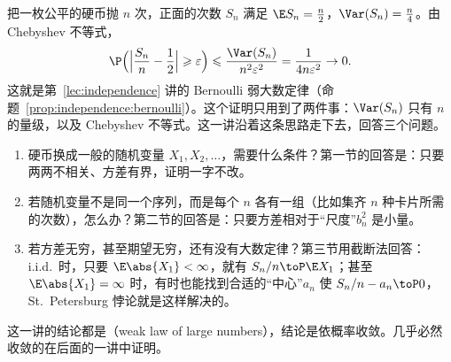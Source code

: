 \label{lec:weak-laws}

把一枚公平的硬币抛 $n$ 次，正面的次数 $S_n$ 满足 $\E S_n=\frac n2$，$\Var(S_n)=\frac n4$。由 Chebyshev 不等式，
\[
\P\Bigl(\Bigl\lvert\frac{S_n}n-\frac12\Bigr\rvert\geqslant\varepsilon\Bigr)\leqslant\frac{\Var(S_n)}{n^2\varepsilon^2}=\frac1{4n\varepsilon^2}\to0 .
\]
这就是第~\ref{lec:independence} 讲的 Bernoulli 弱大数定律（命题~\ref{prop:independence:bernoulli}）。这个证明只用到了两件事：$\Var(S_n)$ 只有 $n$ 的量级，以及 Chebyshev 不等式。这一讲沿着这条思路走下去，回答三个问题。
\begin{enumerate}
\item 硬币换成一般的随机变量 $X_1,X_2,\dots$，需要什么条件？第一节的回答是：只要两两不相关、方差有界，证明一字不改。
\item 若随机变量不是同一个序列，而是每个 $n$ 各有一组（比如集齐 $n$ 种卡片所需的次数），怎么办？第二节的回答是：只要方差相对于“尺度”$b_n^2$ 是小量。
\item 若方差无穷，甚至期望无穷，还有没有大数定律？第三节用截断法回答：i.i.d.\ 时，只要 $\E\abs{X_1}<\infty$，就有 $S_n/n\toP \E X_1$；甚至 $\E\abs{X_1}=\infty$ 时，有时也能找到合适的“中心”$a_n$ 使 $S_n/n-a_n\toP0$，St.\ Petersburg 悖论就是这样解决的。
\end{enumerate}
这一讲的结论都是（weak law of large numbers），结论是依概率收敛。几乎必然收敛的在后面的一讲中证明。


